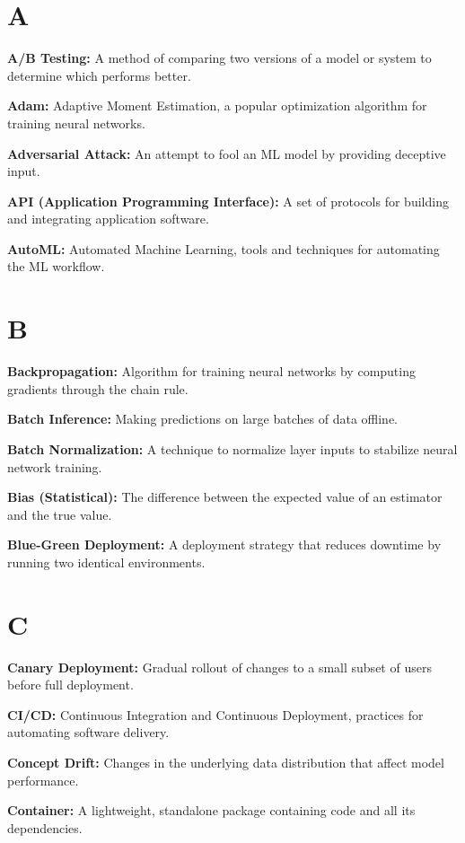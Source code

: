 \section*{A}

\textbf{A/B Testing:} A method of comparing two versions of a model or system to determine which performs better.

\textbf{Adam:} Adaptive Moment Estimation, a popular optimization algorithm for training neural networks.

\textbf{Adversarial Attack:} An attempt to fool an ML model by providing deceptive input.

\textbf{API (Application Programming Interface):} A set of protocols for building and integrating application software.

\textbf{AutoML:} Automated Machine Learning, tools and techniques for automating the ML workflow.

\section*{B}

\textbf{Backpropagation:} Algorithm for training neural networks by computing gradients through the chain rule.

\textbf{Batch Inference:} Making predictions on large batches of data offline.

\textbf{Batch Normalization:} A technique to normalize layer inputs to stabilize neural network training.

\textbf{Bias (Statistical):} The difference between the expected value of an estimator and the true value.

\textbf{Blue-Green Deployment:} A deployment strategy that reduces downtime by running two identical environments.

\section*{C}

\textbf{Canary Deployment:} Gradual rollout of changes to a small subset of users before full deployment.

\textbf{CI/CD:} Continuous Integration and Continuous Deployment, practices for automating software delivery.

\textbf{Concept Drift:} Changes in the underlying data distribution that affect model performance.

\textbf{Container:} A lightweight, standalone package containing code and all its dependencies.

